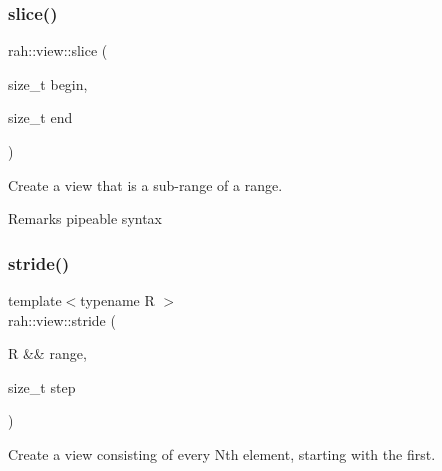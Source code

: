 \subsubsection{\texorpdfstring{slice()}{slice()}\hspace{0.1cm}{\footnotesize\ttfamily [2/2]}}
{\footnotesize\ttfamily rah\+::view\+::slice (\begin{DoxyParamCaption}\item[{size\+\_\+t}]{begin,  }\item[{size\+\_\+t}]{end }\end{DoxyParamCaption})}



Create a view that is a sub-\/range of a range. 

\begin{DoxyRemark}{Remarks}
pipeable syntax
\end{DoxyRemark}

\begin{DoxyCodeInclude}{0}
\end{DoxyCodeInclude}
\mbox{\label{namespacerah_1_1view_ad71e78df55f6f9416e2869a8c14f6779}} 
\subsubsection{\texorpdfstring{stride()}{stride()}\hspace{0.1cm}{\footnotesize\ttfamily [1/2]}}
{\footnotesize\ttfamily template$<$typename R $>$ \\
rah\+::view\+::stride (\begin{DoxyParamCaption}\item[{R \&\&}]{range,  }\item[{size\+\_\+t}]{step }\end{DoxyParamCaption})}



Create a view consisting of every Nth element, starting with the first. 


